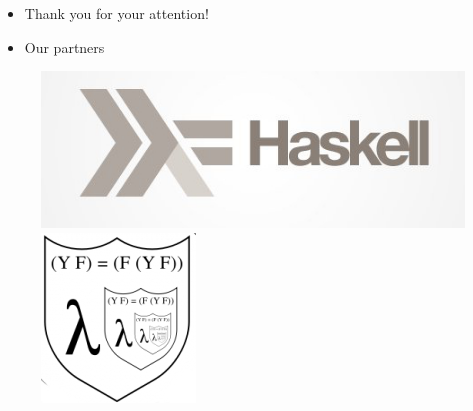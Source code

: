 \documentclass{beamer}
\begin{document}
\begin{frame}
\begin{itemize}
\item Thank you for your attention!
\pause
\item Our partners
\end{itemize}
\pause
\begin{figure}
\includegraphics[scale=0.25]{haskell.jpg}
\includegraphics[scale=0.5]{knight.jpg}
\end{figure} 

\end{frame}
\end{document}
